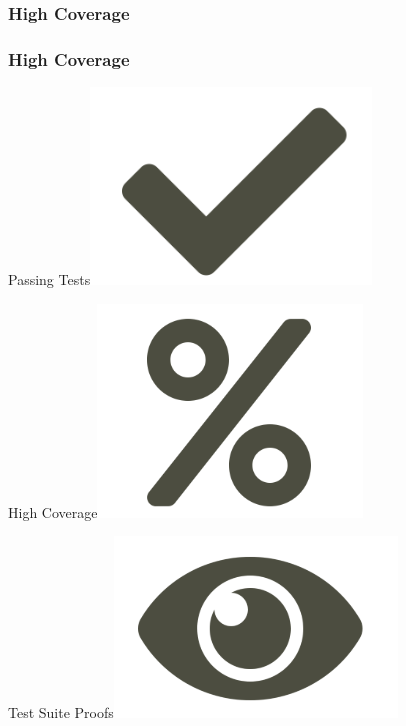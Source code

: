 \subsubsection{High Coverage}
%
%
\begin{frame}
	\frametitle{High Coverage}
		\huge{Passing Tests}\hfill\includegraphics[scale = 0.25]{images/check.png}

		\huge{High Coverage}\hfill\includegraphics[scale = 0.23]{images/percent.png}

		\huge{Test Suite Proofs}\hfill\includegraphics[scale = 0.25]{images/eye.png}
\end{frame}

